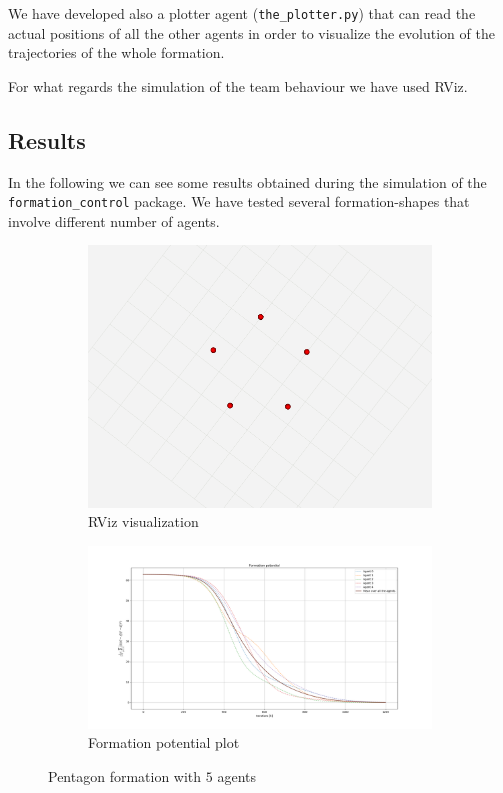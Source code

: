 \documentclass[a4paper,11pt,oneside]{book}
\begin{document}
\bigskip
We have developed also a plotter agent (\texttt{the\_plotter.py}) that can read the actual positions of all the other agents in order to visualize the evolution of the trajectories of the whole formation.

For what regards the simulation of the team behaviour we have used RViz.

\subsection{Results}
In the following we can see some results obtained during the simulation of the \texttt{formation\_control} package. 
We have tested several formation-shapes that involve different number of agents.


\begin{figure}[h]
\centering
	\begin{subfigure}{0.49\textwidth}	
	\includegraphics[scale=0.24]{pentagon_rviz}
	\caption{RViz visualization}
	\end{subfigure}
\hfill
	\begin{subfigure}{0.49\textwidth}	
	\includegraphics[scale=0.42]{Task-2.2_Formation-p_No-Coll-Avoid_Pentagon}
	\caption{Formation potential plot}
	\end{subfigure}
\caption{Pentagon formation with $5$ agents}
\label{Pentagon}
\end{figure}
\end{document}
